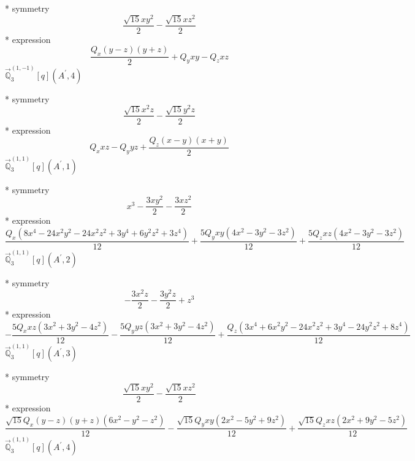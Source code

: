 \documentclass[fleqn,8pt]{jsarticle}
\begin{document}
\noindent\quad ** symmetry
\begin{dmath*}
\frac{\sqrt{15} x y^{2}}{2} - \frac{\sqrt{15} x z^{2}}{2}
\end{dmath*}
\noindent\quad ** expression
\begin{dmath*}
\frac{Q_{x} \left(y - z\right) \left(y + z\right)}{2} + Q_{y} x y - Q_{z} x z
\end{dmath*}
\noindent\quad $\vec{\mathbb{Q}}_{3}^{(1,-1)}[q](A^{\prime},4)$

\noindent\quad ** symmetry
\begin{dmath*}
\frac{\sqrt{15} x^{2} z}{2} - \frac{\sqrt{15} y^{2} z}{2}
\end{dmath*}
\noindent\quad ** expression
\begin{dmath*}
Q_{x} x z - Q_{y} y z + \frac{Q_{z} \left(x - y\right) \left(x + y\right)}{2}
\end{dmath*}
\noindent\quad $\vec{\mathbb{Q}}_{3}^{(1,1)}[q](A^{\prime},1)$

\noindent\quad ** symmetry
\begin{dmath*}
x^{3} - \frac{3 x y^{2}}{2} - \frac{3 x z^{2}}{2}
\end{dmath*}
\noindent\quad ** expression
\begin{dmath*}
\frac{Q_{x} \left(8 x^{4} - 24 x^{2} y^{2} - 24 x^{2} z^{2} + 3 y^{4} + 6 y^{2} z^{2} + 3 z^{4}\right)}{12} + \frac{5 Q_{y} x y \left(4 x^{2} - 3 y^{2} - 3 z^{2}\right)}{12} + \frac{5 Q_{z} x z \left(4 x^{2} - 3 y^{2} - 3 z^{2}\right)}{12}
\end{dmath*}
\noindent\quad $\vec{\mathbb{Q}}_{3}^{(1,1)}[q](A^{\prime},2)$

\noindent\quad ** symmetry
\begin{dmath*}
- \frac{3 x^{2} z}{2} - \frac{3 y^{2} z}{2} + z^{3}
\end{dmath*}
\noindent\quad ** expression
\begin{dmath*}
- \frac{5 Q_{x} x z \left(3 x^{2} + 3 y^{2} - 4 z^{2}\right)}{12} - \frac{5 Q_{y} y z \left(3 x^{2} + 3 y^{2} - 4 z^{2}\right)}{12} + \frac{Q_{z} \left(3 x^{4} + 6 x^{2} y^{2} - 24 x^{2} z^{2} + 3 y^{4} - 24 y^{2} z^{2} + 8 z^{4}\right)}{12}
\end{dmath*}
\noindent\quad $\vec{\mathbb{Q}}_{3}^{(1,1)}[q](A^{\prime},3)$

\noindent\quad ** symmetry
\begin{dmath*}
\frac{\sqrt{15} x y^{2}}{2} - \frac{\sqrt{15} x z^{2}}{2}
\end{dmath*}
\noindent\quad ** expression
\begin{dmath*}
\frac{\sqrt{15} Q_{x} \left(y - z\right) \left(y + z\right) \left(6 x^{2} - y^{2} - z^{2}\right)}{12} - \frac{\sqrt{15} Q_{y} x y \left(2 x^{2} - 5 y^{2} + 9 z^{2}\right)}{12} + \frac{\sqrt{15} Q_{z} x z \left(2 x^{2} + 9 y^{2} - 5 z^{2}\right)}{12}
\end{dmath*}
\noindent\quad $\vec{\mathbb{Q}}_{3}^{(1,1)}[q](A^{\prime},4)$
\end{document}

